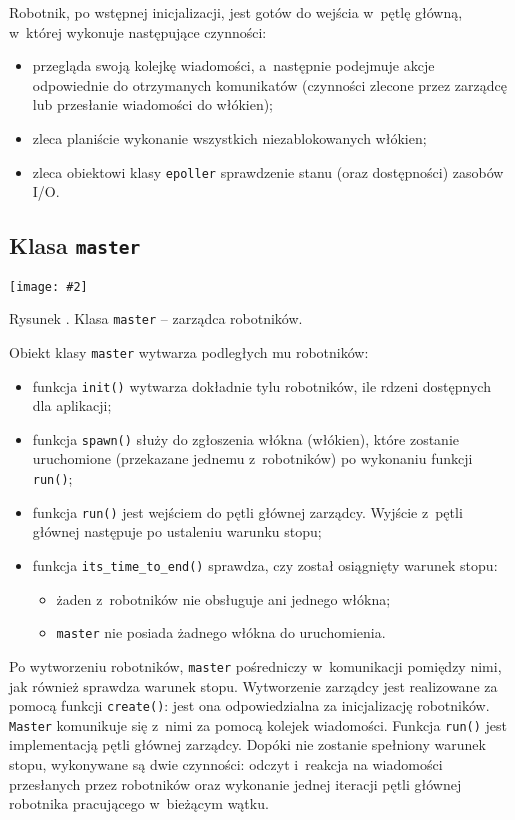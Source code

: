 \documentclass[12pt]{mwart}
\newcommand{\code}{\texttt}
\newcommand{\procbr}{()}
\newcounter{figmain}
\newcommand{\myownfigure}[4]{ \newcounter{#1} \setcounter{#1}{\value{figmain}} \addtocounter{figmain}{1} \begin{center} \label{fig:#1} \centering \texttt{[image: \#2]}\\ \nopagebreak[5] \parbox[t]{11.5cm}{Rysunek \arabic{#1}. #3.} \end{center}}
\begin{document}
\par
\indent
  Robotnik, po wstępnej inicjalizacji, jest gotów do wejścia w~pętlę główną, w~której wykonuje następujące czynności:
  \begin{itemize}
    \item przegląda swoją kolejkę wiadomości, a~następnie podejmuje akcje odpowiednie do otrzymanych komunikatów (czynności zlecone przez zarządcę 
      lub przesłanie wiadomości do włókien);
    \item zleca planiście wykonanie wszystkich niezablokowanych włókien;
    \item zleca obiektowi klasy \code{epoller} sprawdzenie stanu (oraz dostępności) zasobów I/O.
  \end{itemize}
\par
%
\newpage
\subsection{Klasa \code{master}}
    \myownfigure{Master}{Master.png}{Klasa \code{master} -- zarządca robotników}{.7}
%
\indent
  Obiekt klasy \code{master} wytwarza podległych mu robotników:  
  \begin{itemize}
    \item funkcja \code{init()} wytwarza dokładnie tylu robotników, ile rdzeni dostępnych dla aplikacji;
    \item funkcja \code{spawn()} służy do zgłoszenia włókna (włókien), które zostanie uruchomione (przekazane jednemu z~robotników) po wykonaniu funkcji \code{run()};
    \item funkcja \code{run()} jest wejściem do pętli głównej zarządcy. Wyjście z~pętli głównej następuje po ustaleniu warunku stopu;
    \item funkcja \code{its\_time\_to\_end()} sprawdza, czy został osiągnięty warunek stopu:
      \begin{itemize}
        \item żaden z~robotników nie obsługuje ani jednego włókna;
        \item \code{master} nie posiada żadnego włókna do uruchomienia.
      \end{itemize}
  \end{itemize}
  Po wytworzeniu robotników, \code{master} pośredniczy w~komunikacji pomiędzy nimi, jak również sprawdza warunek stopu.
  Wytworzenie zarządcy jest realizowane za pomocą funkcji \code{create()}: 
  jest ona odpowiedzialna za inicjalizację robotników.
  \code{Master} komunikuje się z~nimi za pomocą kolejek wiadomości.
  Funkcja \code{run\procbr} jest implementacją pętli głównej zarządcy. Dopóki nie zostanie spełniony warunek stopu,
  wykonywane są dwie czynności: odczyt i~reakcja na wiadomości przesłanych przez robotników oraz wykonanie jednej iteracji pętli głównej
  robotnika pracującego w~bieżącym wątku.
\par
\newpage
\end{document}
